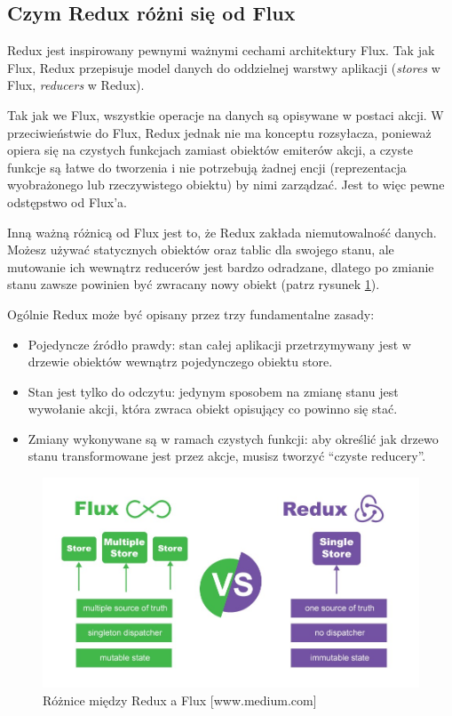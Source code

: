 \subsection{Czym Redux różni się od Flux}

Redux jest inspirowany pewnymi ważnymi cechami architektury Flux.
Tak jak Flux, Redux przepisuje model danych do oddzielnej warstwy aplikacji
(\textit{stores} w Flux, \textit{reducers} w Redux).

Tak jak we Flux, wszystkie operacje na danych są opisywane w postaci akcji.
W przeciwieństwie do Flux, Redux jednak nie ma konceptu rozsyłacza,
ponieważ opiera się na czystych funkcjach zamiast obiektów emiterów akcji,
a czyste funkcje są łatwe do tworzenia i nie potrzebują żadnej encji
(reprezentacja wyobrażonego lub rzeczywistego obiektu) by nimi zarządzać.
Jest to więc pewne odstępstwo od Flux’a.
\cite{www_nafrontendzie}

Inną ważną różnicą od Flux jest to, że Redux zakłada niemutowalność danych.
Możesz używać statycznych obiektów oraz tablic dla swojego stanu,
ale mutowanie ich wewnątrz reducerów jest bardzo odradzane,
dlatego po zmianie stanu zawsze powinien być zwracany nowy obiekt (patrz rysunek \ref{rys:reduxFlux}).

Ogólnie Redux może być opisany przez trzy fundamentalne zasady:
\begin{itemize}
	\item Pojedyncze źródło prawdy: stan całej aplikacji przetrzymywany jest
	w drzewie obiektów wewnątrz pojedynczego obiektu store.
	\item Stan jest tylko do odczytu: jedynym sposobem na zmianę stanu jest wywołanie akcji,
	która zwraca obiekt opisujący co powinno się stać.
	\item Zmiany wykonywane są w ramach czystych funkcji: aby określić jak drzewo stanu
	transformowane jest przez akcje, musisz tworzyć ``czyste reducery''.
\end{itemize}

\begin{figure}[H]
	\centering\includegraphics[width=.8\textwidth]{img/reduxFlux}
	\caption{Różnice między Redux a Flux [www.medium.com]}\label{rys:reduxFlux}%
\end{figure}

